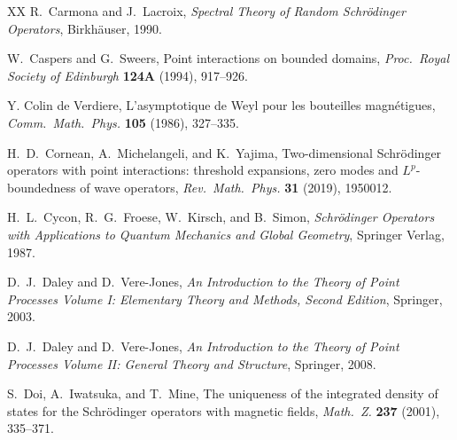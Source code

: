 \documentclass[12pt,a4paper]{article}
\begin{document}
\begin{thebibliography}{XX}
R.\ Carmona and J.\ Lacroix,
\textit{Spectral Theory of Random Schr\"odinger Operators},
Birkh\"auser,
1990.


W.\ Caspers and G.\ Sweers,
Point interactions on bounded domains,
\textit{Proc.\ Royal Society of Edinburgh} \textbf{124A} (1994), 917--926.

Y. Colin de Verdiere,
L'asymptotique de Weyl pour les bouteilles
magn\'etigues,
\textit{Comm.\ Math.\ Phys.} \textbf{105} (1986), 327--335.


H.\ D.\ Cornean, A.\ Michelangeli, and K.\ Yajima,
Two-dimensional Schr{\"o}dinger operators with point interactions: 
threshold expansions, zero modes and $L^p$-boundedness of wave operators,
\textit{Rev.\ Math.\ Phys.} \textbf{31} (2019),
1950012.



H.\ L.\ Cycon,
R.\ G.\ Froese,
W.\ Kirsch,
and B.\ Simon,
\textit{Schr\"odinger Operators with Applications
to Quantum Mechanics and Global Geometry},
Springer Verlag, 1987.





D.\ J.\ Daley and  D.\ Vere-Jones,
\textit{An Introduction to the Theory of Point Processes
Volume I: Elementary Theory and Methods, 
Second Edition},
Springer, 2003.


D.\ J.\ Daley and  D.\ Vere-Jones,
\textit{An Introduction to the Theory of Point Processes
Volume II: General Theory and Structure},
Springer, 2008.




S.\ Doi, A.\ Iwatsuka, and T.\ Mine,
The uniqueness of the integrated density of states
for the Schr\"odinger operators with magnetic fields,
\textit{Math.\ Z.} \textbf{237} (2001), 335--371.


\end{thebibliography}
\end{document}
